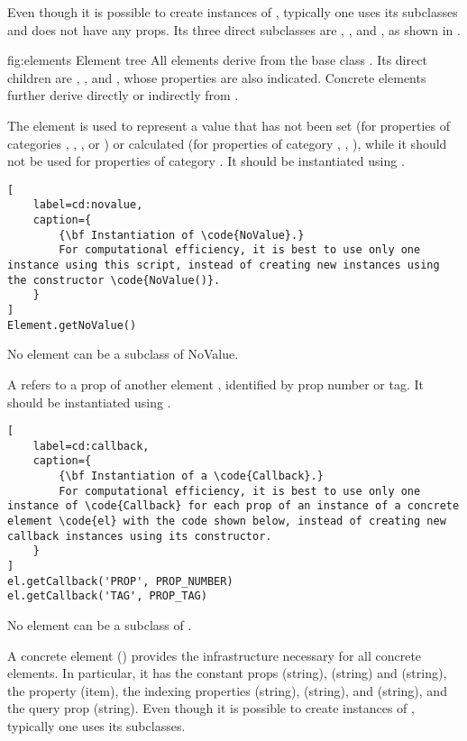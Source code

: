 \documentclass{tufte-handout}
\begin{document}
Even though it is possible to create instances of , typically one uses its subclasses and does not have any props.
Its three direct subclasses are , , and , as shown in .

	{fig:elements}
	{}
	{Element tree}
	{
	All elements derive from the base class . 
	Its direct children are , , and , whose properties are also indicated.
	Concrete elements further derive directly or indirectly from .
	}

The element  is used to represent a value that has not been set (for properties of categories , , ,  or ) or calculated (for properties of category , , ), while it should not be used for properties of category .
It should be instantiated using .
%
\begin{lstlisting}[
	label=cd:novalue,
	caption={
		{\bf Instantiation of \code{NoValue}.}
		For computational efficiency, it is best to use only one instance using this script, instead of creating new instances using the constructor \code{NoValue()}. 
	}
]
Element.getNoValue()
\end{lstlisting}
%
No element can be a subclass of NoValue.
  
A  refers to a prop of another element , identified by prop number or tag.
It should be instantiated using .
%
\begin{lstlisting}[
	label=cd:callback,
	caption={
		{\bf Instantiation of a \code{Callback}.}
		For computational efficiency, it is best to use only one instance of \code{Callback} for each prop of an instance of a concrete element \code{el} with the code shown below, instead of creating new callback instances using its constructor. 
	}
]
el.getCallback('PROP', PROP_NUMBER)
el.getCallback('TAG', PROP_TAG)
\end{lstlisting}
%
No element can be a subclass of .

A concrete element () provides the infrastructure necessary for all concrete elements. 
In particular, it has the constant props  (string),  (string) and  (string), the property  (item), the indexing properties  (string),  (string), and  (string), and the query prop  (string).
Even though it is possible to create instances of , typically one uses its subclasses.
\end{document}
